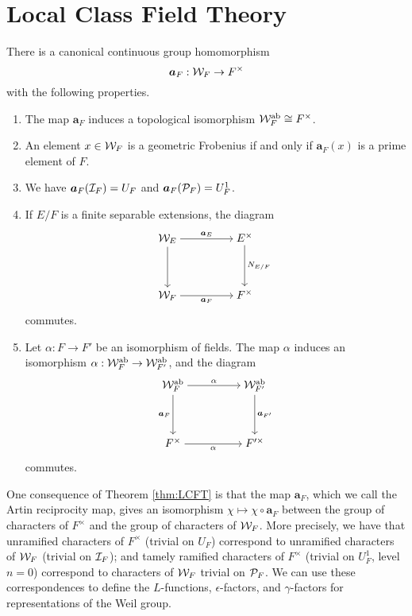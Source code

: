 \section{Local Class Field Theory}
\label{sec:LCFT}
\begin{theorem}
\label{thm:LCFT}
  There is a canonical continuous group homomorphism
  \[\bm{a}_F : \mathcal{W}_F \to F^\times\]
  with the following properties.
  \begin{enumerate}
    \item The map $\bm{a}_F$ induces a topological isomorphism $\mathcal{W}_F^{\text{ab}} \cong F^\times$.
    \item An element $x \in \mathcal{W}_F$ is a geometric Frobenius if and only if $\bm{a}_F(x)$ is a prime element of $F$.
    \item We have $\bm{a}_F(\mathcal{I}_F) = U_F$ and $\bm{a}_F(\mathcal{P}_F) = U^1_F$.
    \item If $E/F$ is a finite separable extensions, the diagram \[\begin{tikzcd}[ampersand replacement=\&,cramped]
	{\mathcal{W}_E} \&\& {E^\times} \\
	\\
	{\mathcal{W}_F} \&\& {F^\times}
	\arrow["{\bm{a}_E}", from=1-1, to=1-3]
	\arrow["{\bm{a}_F}"', from=3-1, to=3-3]
	\arrow[from=1-1, to=3-1]
	\arrow["{N_{E/F}}", from=1-3, to=3-3]
\end{tikzcd}\] commutes.
    \item Let $\alpha : F \to F'$ be an isomorphism of fields. The map $\alpha$ induces an isomorphism $\alpha: \mathcal{W}^{\text{ab}}_F \to \mathcal{W}^{\text{ab}}_{F'}$, and the diagram \[\begin{tikzcd}[ampersand replacement=\&,cramped]
	{\mathcal{W}_F^{\textrm{ab}}} \&\& {\mathcal{W}_{F'}^{\textrm{ab}}} \\
	\\
	{F^\times} \&\& {F'^\times}
	\arrow["\alpha", from=1-1, to=1-3]
	\arrow["\alpha"', from=3-1, to=3-3]
	\arrow["{\bm{a}_F}"', from=1-1, to=3-1]
	\arrow["{\bm{a}_{F'}}", from=1-3, to=3-3]
\end{tikzcd}\]
      commutes.
  \end{enumerate}
\end{theorem}

One consequence of Theorem \ref{thm:LCFT} is that the map $\bm{a}_F$, which we call the Artin reciprocity map, gives an isomorphism $\chi \mapsto \chi \circ \bm{a}_F$ between the group of characters of $F^\times$ and the group of characters of $\mathcal{W}_F$.
More precisely, we have that unramified characters of $F^\times$ (trivial on $U_F$) correspond to unramified characters of $\mathcal{W}_F$ (trivial on $\mathcal{I}_F$); and tamely ramified characters of $F^\times$ (trivial on $U_F^1$, level $n=0$) correspond to characters of $\mathcal{W}_F$ trivial on $\mathcal{P}_F$.
We can use these correspondences to define the $L$-functions, $\epsilon$-factors, and $\gamma$-factors for representations of the Weil group.

